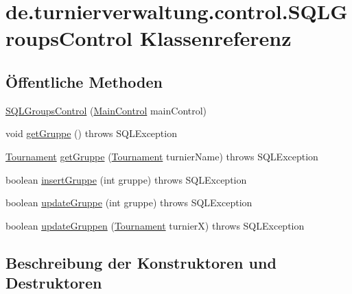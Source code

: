 \hypertarget{classde_1_1turnierverwaltung_1_1control_1_1_s_q_l_groups_control}{}\section{de.\+turnierverwaltung.\+control.\+S\+Q\+L\+Groups\+Control Klassenreferenz}
\label{classde_1_1turnierverwaltung_1_1control_1_1_s_q_l_groups_control}
\subsection*{Öffentliche Methoden}
\begin{DoxyCompactItemize}
\item 
\hyperlink{classde_1_1turnierverwaltung_1_1control_1_1_s_q_l_groups_control_a005360f49a9e35b4e33e12ea4f96611c}{S\+Q\+L\+Groups\+Control} (\hyperlink{classde_1_1turnierverwaltung_1_1control_1_1_main_control}{Main\+Control} main\+Control)
\item 
void \hyperlink{classde_1_1turnierverwaltung_1_1control_1_1_s_q_l_groups_control_aa8b4f852a65c15c2fd7e9264fccb986a}{get\+Gruppe} ()  throws S\+Q\+L\+Exception 
\item 
\hyperlink{classde_1_1turnierverwaltung_1_1model_1_1_tournament}{Tournament} \hyperlink{classde_1_1turnierverwaltung_1_1control_1_1_s_q_l_groups_control_a937b134363584422259926f662801d49}{get\+Gruppe} (\hyperlink{classde_1_1turnierverwaltung_1_1model_1_1_tournament}{Tournament} turnier\+Name)  throws S\+Q\+L\+Exception 
\item 
boolean \hyperlink{classde_1_1turnierverwaltung_1_1control_1_1_s_q_l_groups_control_a1817ddb87e6e61f3c7eb52f1092e3893}{insert\+Gruppe} (int gruppe)  throws S\+Q\+L\+Exception 
\item 
boolean \hyperlink{classde_1_1turnierverwaltung_1_1control_1_1_s_q_l_groups_control_ab2f74069d335f12d65e36affa028093a}{update\+Gruppe} (int gruppe)  throws S\+Q\+L\+Exception 
\item 
boolean \hyperlink{classde_1_1turnierverwaltung_1_1control_1_1_s_q_l_groups_control_a95a5e4f623bcaa6291dbff3d760d4832}{update\+Gruppen} (\hyperlink{classde_1_1turnierverwaltung_1_1model_1_1_tournament}{Tournament} turnierX)  throws S\+Q\+L\+Exception 
\end{DoxyCompactItemize}


\subsection{Beschreibung der Konstruktoren und Destruktoren}
